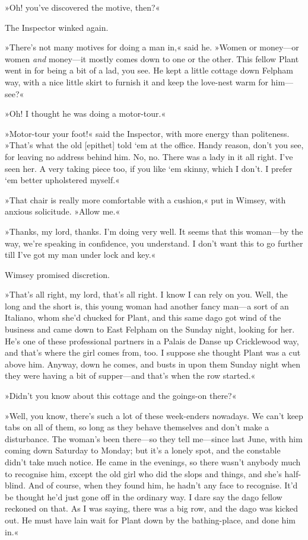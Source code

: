 »Oh! you've discovered the motive, then?«

The Inspector winked again.

»There's not many motives for doing a man in,« said he. »Women or money—or women \textit{and} money—it mostly comes down to one or the other. This fellow Plant went in for being a bit of a lad, you see. He kept a little cottage down Felpham way, with a nice little skirt to furnish it and keep the love-nest warm for him—see?«

»Oh! I thought he was doing a motor-tour.«

»Motor-tour your foot!« said the Inspector, with more energy than politeness. »That's what the old [epithet] told `em at the office. Handy reason, don't you see, for leaving no address behind him. No, no. There was a lady in it all right. I've seen her. A very taking piece too, if you like `em skinny, which I don't. I prefer `em better upholstered myself.«

»That chair is really more comfortable with a cushion,« put in Wimsey, with anxious solicitude. »Allow me.«

»Thanks, my lord, thanks. I'm doing very well. It seems that this woman—by the way, we're speaking in confidence, you understand. I don't want this to go further till I've got my man under lock and key.«

Wimsey promised discretion.

»That's all right, my lord, that's all right. I know I can rely on you. Well, the long and the short is, this young woman had another fancy man—a sort of an Italiano, whom she'd chucked for Plant, and this same dago got wind of the business and came down to East Felpham on the Sunday night, looking for her. He's one of these professional partners in a Palais de Danse up Cricklewood way, and that's where the girl comes from, too. I suppose she thought Plant was a cut above him. Anyway, down he comes, and busts in upon them Sunday night when they were having a bit of supper—and that's when the row started.«

»Didn't you know about this cottage and the goings-on there?«

»Well, you know, there's such a lot of these week-enders nowadays. We can't keep tabs on all of them, so long as they behave themselves and don't make a disturbance. The woman's been there—so they tell me—since last June, with him coming down Saturday to Monday; but it's a lonely spot, and the constable didn't take much notice. He came in the evenings, so there wasn't anybody much to recognise him, except the old girl who did the slops and things, and she's half-blind. And of course, when they found him, he hadn't any face to recognise. It'd be thought he'd just gone off in the ordinary way. I dare say the dago fellow reckoned on that. As I was saying, there was a big row, and the dago was kicked out. He must have lain wait for Plant down by the bathing-place, and done him in.«

